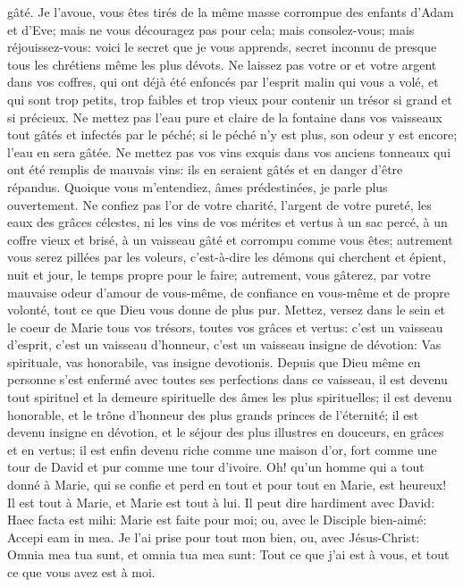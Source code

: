 gâté. Je l'avoue, vous êtes tirés de la même masse corrompue des enfants d'Adam et d'Eve; mais ne vous
découragez pas pour cela; mais consolez-vous; mais réjouissez-vous: voici le secret que je vous apprends, secret
inconnu de presque tous les chrétiens même les plus dévots.
Ne laissez pas votre or et votre argent dans vos coffres, qui ont déjà été enfoncés par l'esprit malin qui vous a
volé, et qui sont trop petits, trop faibles et trop vieux pour contenir un trésor si grand et si précieux. Ne mettez pas
l'eau pure et claire de la fontaine dans vos vaisseaux tout gâtés et infectés par le péché; si le péché n'y est plus,
son odeur y est encore; l'eau en sera gâtée. Ne mettez pas vos vins exquis dans vos anciens tonneaux qui ont été
remplis de mauvais vins: ils en seraient gâtés et en danger d'être répandus.
 Quoique vous m'entendiez, âmes prédestinées, je parle plus ouvertement. Ne confiez pas l'or de votre
charité, l'argent de votre pureté, les eaux des grâces célestes, ni les vins de vos mérites et vertus à un sac percé,
à un coffre vieux et brisé, à un vaisseau gâté et corrompu comme vous êtes; autrement vous serez pillées par les
voleurs, c'est-à-dire les démons qui cherchent et épient, nuit et jour, le temps propre pour le faire; autrement, vous
gâterez, par votre mauvaise odeur d'amour de vous-même, de confiance en vous-même et de propre volonté, tout
ce que Dieu vous donne de plus pur. Mettez, versez dans le sein et le coeur de Marie tous vos trésors, toutes vos
grâces et vertus: c'est un vaisseau d'esprit, c'est un vaisseau d'honneur, c'est un vaisseau insigne de dévotion:
Vas spirituale, vas honorabile, vas insigne devotionis. Depuis que Dieu même en personne s'est enfermé avec
toutes ses perfections dans ce vaisseau, il est devenu tout spirituel et la demeure spirituelle des âmes les plus
spirituelles; il est devenu honorable, et le trône d'honneur des plus grands princes de l'éternité; il est devenu
insigne en dévotion, et le séjour des plus illustres en douceurs, en grâces et en vertus; il est enfin devenu riche
comme une maison d'or, fort comme une tour de David et pur comme une tour d'ivoire.
 Oh! qu'un homme qui a tout donné à Marie, qui se confie et perd en tout et pour tout en Marie, est heureux! Il
est tout à Marie, et Marie est tout à lui. Il peut dire hardiment avec David: Haec facta est mihi: Marie est faite pour
moi; ou, avec le Disciple bien-aimé: Accepi eam in mea. Je l'ai prise pour tout mon bien, ou, avec Jésus-Christ:
Omnia mea tua sunt, et omnia tua mea sunt: Tout ce que j'ai est à vous, et tout ce que vous avez est à moi.

